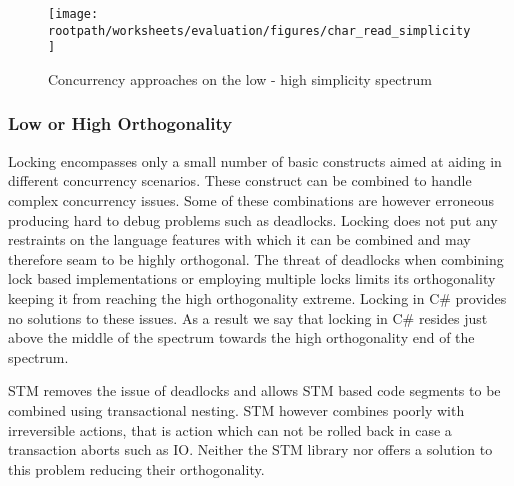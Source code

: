 
\begin{figure}[htbp]
\centering
 \texttt{[image: \\rootpath/worksheets/evaluation/figures/char\_read\_simplicity]} 
 \caption{Concurrency approaches on the low - high simplicity spectrum}
\label{fig:char_simplicity}
\end{figure}
\subsubsection{Low or High Orthogonality}\label{subsec:orthogonality}
Locking encompasses only a small number of basic constructs aimed at aiding in different concurrency scenarios. These construct can be combined to handle complex concurrency issues. Some of these combinations are however erroneous producing hard to debug problems such as deadlocks. Locking does not put any restraints on the language features with which it can be combined and may therefore seam to be highly orthogonal. The threat  of deadlocks when combining lock based implementations or employing multiple locks limits its orthogonality keeping it from reaching the high orthogonality extreme. Locking in C\# provides no solutions to these issues. As a result we say that locking in C\# resides just above the middle of the spectrum towards the high orthogonality end of the spectrum.

\ac{STM} removes the issue of deadlocks and allows \ac{STM} based code segments to be combined using transactional nesting. \ac{STM} however combines poorly with irreversible actions, that is action which can not be rolled back in case a transaction aborts such as \ac{IO}. Neither the \ac{STM} library nor \stmnamesp offers a solution to this problem reducing their orthogonality. 

